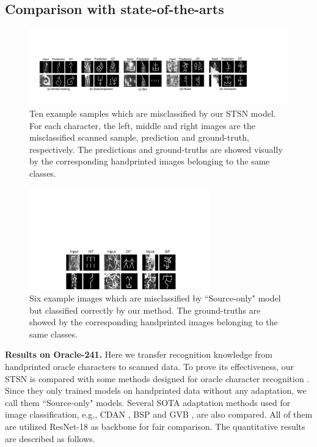 \documentclass[10pt,journal,compsoc,twocolumn ]{IEEEtran}
\begin{document}
\subsection{Comparison with state-of-the-arts}

\begin{figure}
\centering
\includegraphics[width=17cm]{STSN_bad.pdf}
\caption{Ten example samples which are misclassified by our STSN model. For each character, the left, middle and right images are the misclassified scanned sample, prediction and ground-truth, respectively. The predictions and ground-truths are showed visually by the corresponding handprinted images belonging to the same classes.}
\label{error_img} %
\end{figure}

\begin{figure}
\centering
\includegraphics[width=7.8cm]{STSN_correct.pdf}
\caption{Six example images which are misclassified by ``Source-only" model but classified correctly by our method. The ground-truths are showed by the corresponding handprinted images belonging to the same classes.}
\label{correct_img} %
\end{figure}

\textbf{Results on Oracle-241.} Here we transfer recognition knowledge from handprinted oracle characters to scanned data. To prove its effectiveness, our STSN is compared with some methods designed for oracle character recognition \cite{huang2019obc306,zhang2019oracle}. Since they only trained models on handprinted data without any adaptation, we call them ``Source-only" models. Several SOTA adaptation methods used for image classification, e.g., CDAN \cite{long2018conditional}, BSP \cite{chen2019transferability} and GVB \cite{cui2020gradually}, are also compared. %
All of them are utilized ResNet-18 as backbone for fair comparison. The quantitative results are described as follows.
\end{document}
